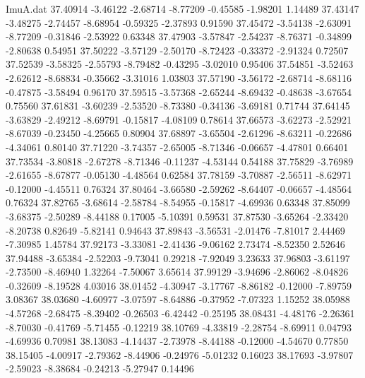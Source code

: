 \begin{filecontents}{ImuA.dat}
  37.40914   -3.46122   -2.68714   -8.77209   -0.45585   -1.98201    1.14489
  37.43147   -3.48275   -2.74457   -8.68954   -0.59325   -2.37893    0.91590
  37.45472   -3.54138   -2.63091   -8.77209   -0.31846   -2.53922    0.63348
  37.47903   -3.57847   -2.54237   -8.76371   -0.34899   -2.80638    0.54951
  37.50222   -3.57129   -2.50170   -8.72423   -0.33372   -2.91324    0.72507
  37.52539   -3.58325   -2.55793   -8.79482   -0.43295   -3.02010    0.95406
  37.54851   -3.52463   -2.62612   -8.68834   -0.35662   -3.31016    1.03803
  37.57190   -3.56172   -2.68714   -8.68116   -0.47875   -3.58494    0.96170
  37.59515   -3.57368   -2.65244   -8.69432   -0.48638   -3.67654    0.75560
  37.61831   -3.60239   -2.53520   -8.73380   -0.34136   -3.69181    0.71744
  37.64145   -3.63829   -2.49212   -8.69791   -0.15817   -4.08109    0.78614
  37.66573   -3.62273   -2.52921   -8.67039   -0.23450   -4.25665    0.80904
  37.68897   -3.65504   -2.61296   -8.63211   -0.22686   -4.34061    0.80140
  37.71220   -3.74357   -2.65005   -8.71346   -0.06657   -4.47801    0.66401
  37.73534   -3.80818   -2.67278   -8.71346   -0.11237   -4.53144    0.54188
  37.75829   -3.76989   -2.61655   -8.67877   -0.05130   -4.48564    0.62584
  37.78159   -3.70887   -2.56511   -8.62971   -0.12000   -4.45511    0.76324
  37.80464   -3.66580   -2.59262   -8.64407   -0.06657   -4.48564    0.76324
  37.82765   -3.68614   -2.58784   -8.54955   -0.15817   -4.69936    0.63348
  37.85099   -3.68375   -2.50289   -8.44188    0.17005   -5.10391    0.59531
  37.87530   -3.65264   -2.33420   -8.20738    0.82649   -5.82141    0.94643
  37.89843   -3.56531   -2.01476   -7.81017    2.44469   -7.30985    1.45784
  37.92173   -3.33081   -2.41436   -9.06162    2.73474   -8.52350    2.52646
  37.94488   -3.65384   -2.52203   -9.73041    0.29218   -7.92049    3.23633
  37.96803   -3.61197   -2.73500   -8.46940    1.32264   -7.50067    3.65614
  37.99129   -3.94696   -2.86062   -8.04826   -0.32609   -8.19528    4.03016
  38.01452   -4.30947   -3.17767   -8.86182   -0.12000   -7.89759    3.08367
  38.03680   -4.60977   -3.07597   -8.64886   -0.37952   -7.07323    1.15252
  38.05988   -4.57268   -2.68475   -8.39402   -0.26503   -6.42442   -0.25195
  38.08431   -4.48176   -2.26361   -8.70030   -0.41769   -5.71455   -0.12219
  38.10769   -4.33819   -2.28754   -8.69911    0.04793   -4.69936    0.70981
  38.13083   -4.14437   -2.73978   -8.44188   -0.12000   -4.54670    0.77850
  38.15405   -4.00917   -2.79362   -8.44906   -0.24976   -5.01232    0.16023
  38.17693   -3.97807   -2.59023   -8.38684   -0.24213   -5.27947    0.14496

\end{filecontents}
